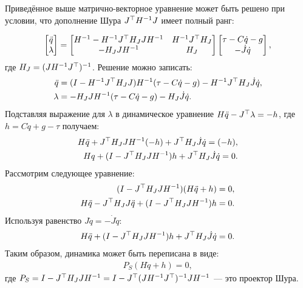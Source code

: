 Приведённое выше матрично-векторное уравнение может быть решено при условии, что дополнение Шура ${J}^\top {H}^{-1}{J}$ имеет полный ранг:

\begin{equation}
	\begin{bmatrix}
		\ddot{{q}} \\
		\lambda
	\end{bmatrix}
	=
	\begin{bmatrix}
		{H}^{-1}-{H}^{-1} {J}^\top {H}_J {J} {H}^{-1} &
		{H}^{-1} {J}^\top {H}_J \\
		-{H}_J {J} {H}^{-1} & {H}_J
	\end{bmatrix}
	\begin{bmatrix}
		\tau - {C} \dot{{q}} - {g} \\
		-\dot{{J}} \dot{{q}}
	\end{bmatrix},
\end{equation}
%
где ${H}_J = ( {J} {H}^{-1} {J}^\top )^{-1}$.
%
Решение можно записать:
%
\begin{align}
	\ddot{{q}}
	&=
	({I}-{H}^{-1} {J}^\top {H}_J {J} ) {H}^{-1}(\tau - {C} \dot{{q}} - {g}) 
	-
	{H}^{-1} {J}^\top {H}_J \dot{{J}} \dot{{q}},
	\\
	\lambda
	&=
	-{H}_J {J} {H}^{-1} (\tau - {C} \dot{{q}} - {g})
	-
	{H}_J \dot{{J}} \dot{{q}}.
\end{align}
%
Подставляя выражение для $\lambda$ в динамическое уравнение ${H}\ddot{{q}} - {J}^\top\lambda
=
-{h}$, где ${h} = {C} \dot{{q}} + {g} - \tau$ получаем:
\begin{align}
	{H}\ddot{{q}} + 
	{J}^\top{H}_J {J} {H}^{-1} (-{h}) +
	{J}^\top {H}_J \dot{{J}} \dot{{q}}
	=
	(-{h}),
	\\
	{{H}{{q}} + 
		({I}-
		{J}^\top{H}_J {J} {H}^{-1}) {h} +
		{J}^\top {H}_J \dot{{J}} \dot{{q}}
		=
		0}.
\end{align}
%
Рассмотрим следующее уравнение:
%
\begin{align}
	({I}-
	{J}^\top{H}_J {J} {H}^{-1})({H}\ddot{{q}}+{h})=0,
	\\
	{H}\ddot{{q}} - {J}^\top{H}_J {J} \ddot{{q}}
	+
	({I}-
	{J}^\top{H}_J {J} {H}^{-1}){h} = 0.
\end{align}
%
Используя равенство ${J} \ddot{{q}} = -\dot{{J}} \dot{{q}}$:
%
\begin{align}{
		{H}\ddot{{q}} + ({I}-{J}^\top{H}_J {J} {H}^{-1}){h} + {J}^\top{H}_J \dot{{J}} \dot{{q}} = 0}.
\end{align}
%
Таким образом, динамика может быть переписана в виде: 
%
\begin{align}
	{P}_S({H}\ddot{{q}}+{h})=0,
\end{align}
%
где ${P}_S = {I}-{J}^\top{H}_J {J} {H}^{-1} = 
{I}-{J}^\top ( {J} {H}^{-1} {J}^\top )^{-1} {J} {H}^{-1}$ --- это проектор Шура.

